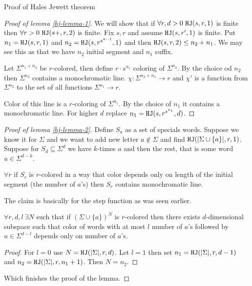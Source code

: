 \begin{topic}{Proof of Hales Jewett theorem}
	\begin{proof}[Proof of lemma \ref{hj-lemma-1}]
		We will show that if $\forall r, d > 0 \ \mathtt{HJ}(s,r,1)$ is finite then $\forall r > 0 \ \mathtt{HJ}(s+, r, 2)$ is finite. Fix $s, r$ and assume $\mathtt{HJ}(s, r', 1)$ is finite. Put $n_1 = \mathtt{HJ}(s,r,1)$ and $n_2 = \mathtt{HJ}(s, r^{s^{n-1}}, 1)$ and then $\mathtt{HJ}(s,r,2) \leq n_2 + n_1$. We may see this as that we have $n_2$ initial segment and $n_1$ suffix.
		
		Let $\Sigma^{n_1 + n_2}$ be $r$-colored, then define $r \cdot s^{n_1}$ coloring of $\Sigma^{n_2}$. By the choice od $n_2$ then $\Sigma^{n_2}$ contains a monochromatic line. $\chi : \Sigma^{n_2 + n_1} \to r$ and $\chi'$ is a function from $\Sigma^{n_2}$ to the set of all functions $\Sigma^{n_1} \to r$.
		
		Color of this line is a $r$-coloring of $\Sigma^{n_1}$. By the choice of $n_1$ it contains a monochromatic line. For higher $d$ replace $n_1 = \mathtt{HJ}(s, r^{s^{n_1}}, d)$.
	\end{proof}

	\begin{proof}[Proof of lemma \ref{hj-lemma-2}]
		Define $S_a$ as a set of specials words. Suppose we know it for $\Sigma$ and we want to add new letter $a \notin \Sigma$ and find $\mathtt{HJ}(|\Sigma \cup \{a\}|, r, 1)$. Suppose for $S_d \subseteq \Sigma^d$ we have $k$-times $a$ and then the rest, that is some word $u \in \Sigma^{d-k}$.
		
		\begin{claim}
			$\forall r$ if $S_r$ is $r$-colored in a way that color depends only on length of the initial segment (the number of $a$'s) then $S_r$ contains monochromatic line.
		\end{claim}
	
		The claim is basically for the step function as was seen earlier.
		
		\begin{claim}
			$\forall r, d, l \ \exists N$ such that if $(\Sigma \cup \{a\})^N$ is $r$-colored then there exists $d$-dimensional subspace such that color of words with at most $l$ number of $a$'s followed by $u \in \Sigma^{d-l}$ depends only on number of $a$'s.
		\end{claim}
	
		\begin{proof}
			For $l = 0$ use $N = \mathtt{HJ}(|\Sigma|, r, d)$. Let $l = 1$ then set $n_1 = \mathtt{HJ}(|\Sigma|, r, d-1)$ and $n_2 = \mathtt{HJ}(|\Sigma|, r, n_1 + 1)$. Then $N = n_2$.
		\end{proof}
	
		Which finishes the proof of the lemma.
	\end{proof}
\end{topic}

